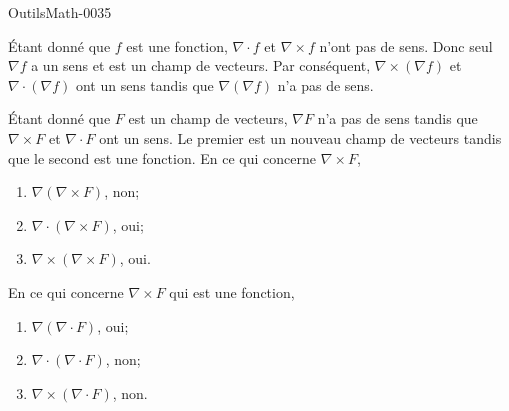 
\begin{corrige}{OutilsMath-0035}

    Étant donné que $f$ est une fonction, $\nabla\cdot f$ et $\nabla\times f$ n'ont pas de sens. Donc seul $\nabla f$ a un sens et est un champ de vecteurs. Par conséquent, $\nabla\times(\nabla f)$ et $\nabla\cdot(\nabla f)$ ont un sens tandis que $\nabla(\nabla f)$ n'a pas de sens.

    Étant donné que $F$ est un champ de vecteurs, $\nabla F$ n'a pas de sens tandis que $\nabla\times F$ et $\nabla\cdot F$ ont un sens. Le premier est un nouveau champ de vecteurs tandis que le second est une fonction. En ce qui concerne $\nabla\times F$,
    \begin{enumerate}
        \item
            $\nabla(\nabla\times F)$, non;
        \item
            $\nabla\cdot(\nabla\times F)$, oui;
        \item
            $\nabla\times(\nabla\times F)$, oui.
    \end{enumerate}
    En ce qui concerne $\nabla\times F$ qui est une fonction,
    \begin{enumerate}
        \item
            $\nabla(\nabla\cdot F)$, oui;
        \item
            $\nabla\cdot(\nabla\cdot F)$, non;
        \item
            $\nabla\times(\nabla\cdot F)$, non.
    \end{enumerate}



\end{corrige}
